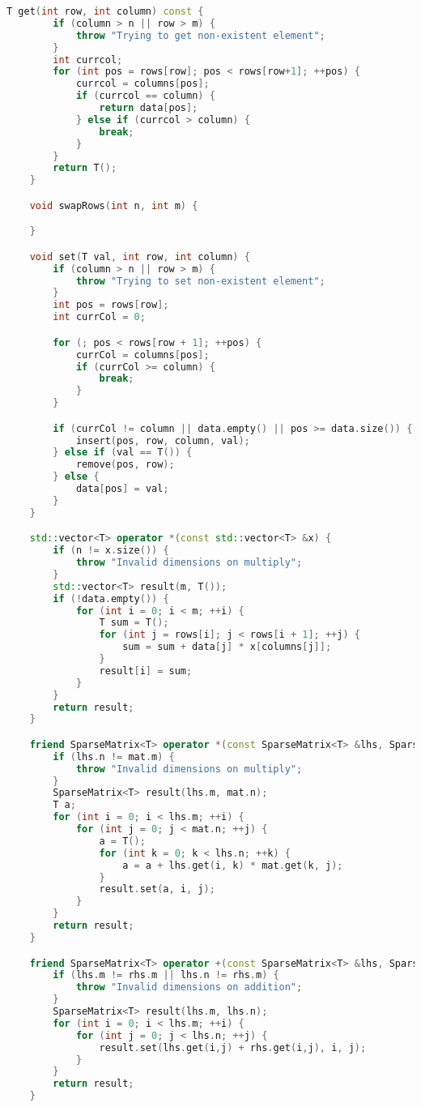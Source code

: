 \begin{lstlisting}[language=C++]
    T get(int row, int column) const {
        if (column > n || row > m) {
            throw "Trying to get non-existent element";
        }
        int currcol;
        for (int pos = rows[row]; pos < rows[row+1]; ++pos) {
            currcol = columns[pos];
            if (currcol == column) {
                return data[pos];
            } else if (currcol > column) {
                break;
            }
        }
        return T();
    }

    void swapRows(int n, int m) {

    }

    void set(T val, int row, int column) {
        if (column > n || row > m) {
            throw "Trying to set non-existent element";
        }
        int pos = rows[row];
        int currCol = 0;

        for (; pos < rows[row + 1]; ++pos) {
            currCol = columns[pos];
            if (currCol >= column) {
                break;
            }
        }

        if (currCol != column || data.empty() || pos >= data.size()) {
            insert(pos, row, column, val);
        } else if (val == T()) {
            remove(pos, row);
        } else {
            data[pos] = val;
        }
    }

    std::vector<T> operator *(const std::vector<T> &x) {
        if (n != x.size()) {
            throw "Invalid dimensions on multiply";
        }
        std::vector<T> result(m, T());
        if (!data.empty()) {
            for (int i = 0; i < m; ++i) {
                T sum = T();
                for (int j = rows[i]; j < rows[i + 1]; ++j) {
                    sum = sum + data[j] * x[columns[j]];
                }
                result[i] = sum;
            }
        }
        return result;
    }

    friend SparseMatrix<T> operator *(const SparseMatrix<T> &lhs, SparseMatrix<T> &mat) {
        if (lhs.n != mat.m) {
            throw "Invalid dimensions on multiply";
        }
        SparseMatrix<T> result(lhs.m, mat.n);
        T a;
        for (int i = 0; i < lhs.m; ++i) {
            for (int j = 0; j < mat.n; ++j) {
                a = T();
                for (int k = 0; k < lhs.n; ++k) {
                    a = a + lhs.get(i, k) * mat.get(k, j);
                }
                result.set(a, i, j);
            }
        }
        return result;
    }

    friend SparseMatrix<T> operator +(const SparseMatrix<T> &lhs, SparseMatrix<T> &rhs) {
        if (lhs.m != rhs.m || lhs.n != rhs.m) {
            throw "Invalid dimensions on addition";
        }
        SparseMatrix<T> result(lhs.m, lhs.n);
        for (int i = 0; i < lhs.m; ++i) {
            for (int j = 0; j < lhs.n; ++j) {
                result.set(lhs.get(i,j) + rhs.get(i,j), i, j);
            }
        }
        return result;
    }


\end{lstlisting}
